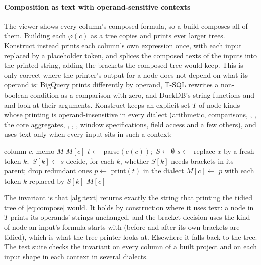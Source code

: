 \paragraph{Composition as text with operand-sensitive contexts}
The viewer shows every column's composed formula, so a build composes all of them. Building each
$\varphi(c)$ as a tree copies and prints ever larger trees. Konstruct instead prints each column's
own expression once, with each input replaced by a placeholder token, and splices the composed
texts of the inputs into the printed string, adding the brackets the composed tree would keep.
This is only correct where the printer's output for a node does not depend on what its operand is:
BigQuery prints  differently by operand, T-SQL rewrites a non-boolean condition as a
comparison with zero, and DuckDB's string functions and  and  look at their
arguments. Konstruct keeps an explicit set $T$ of \textContexts{} node kinds whose printing is
operand-insensitive in every dialect (arithmetic, comparisons, , , the
core aggregates, , , , window specifications, field access and a few
others), and uses text only when every input sits in such a context:

\begin{algorithm}[t]
\caption{Composing a column's formula as text}
\label{alg:text}
\begin{algorithmic}[1]
\Require column $c$, memo $M$
 \Return $M[c]$ \EndIf
\State $t \gets$ parse$(e(c))$;\ $S \gets \emptyset$
  \State $s \gets$ 
   \Return {} \EndIf
  \State replace $x$ by a fresh token $k$;\ $S[k] \gets s$
\EndFor
\State decide, for each $k$, whether $S[k]$ needs brackets in its parent; drop redundant ones
\State $p \gets$ print$(t)$ in the dialect
 \Return {} \EndIf
\State $M[c] \gets$ $p$ with each token $k$ replaced by $S[k]$
\State \Return $M[c]$
\end{algorithmic}
\end{algorithm}

\noindent The invariant is that \cref{alg:text} returns exactly the string that printing the tidied
tree of \cref{eq:compose} would. It holds by construction where it uses text: a node in $T$ prints
its operands' strings unchanged, and the bracket decision uses the kind of node an input's
formula starts with (before and after its own brackets are tidied), which is what the tree printer
looks at. Elsewhere it falls back to the tree. The test suite checks the invariant on every column
of a built project and on each input shape in each context in several dialects.

